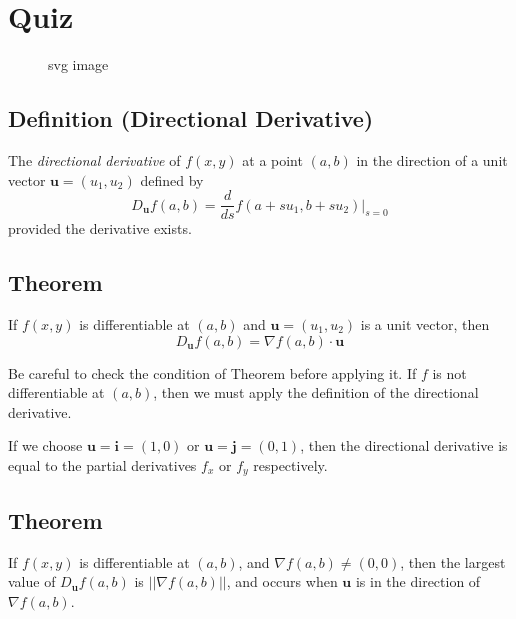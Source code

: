 \section{Quiz}
\begin{figure}[ht]
    \centering
    
    \caption{svg image}
  \end{figure}
\begin{defbox}
\subsection{Definition (Directional Derivative)}
The \emph{directional derivative} of $ f(x,y) $ at a point $ (a,b) $ 
in the direction of a unit vector $ \mathbf{u}=(u_1,u_2) $ 
defined by
\[ D_{\mathbf{u}}f(a,b)=
\frac{d}{ds} f(a+su_1,b+su_2)\Bigr\rvert_{s=0} \]
provided the derivative exists.
\end{defbox}

\begin{thmbox}
\subsection{Theorem}
If $ f(x,y) $ is differentiable at $ (a,b) $ and 
$ \mathbf{u}=(u_1,u_2) $ is a unit vector, then
\[ D_{\mathbf{u}}f(a,b)=\nabla f(a,b) \cdot \mathbf{u} \]
\end{thmbox}

\begin{remark}
    Be careful to check the condition of Theorem before
    applying it. If $ f $ is not differentiable at
    $ (a,b) $, then we must apply the definition of the
    directional derivative.
\end{remark}
\begin{remark}
    If we choose $ \mathbf{u}=\mathbf{i}=(1,0) $ or
    $ \mathbf{u}=\mathbf{j}=(0,1) $, then the directional
    derivative is equal to the partial derivatives $ f_x $ or $ f_y $
    respectively.
\end{remark}

\begin{thmbox}
\subsection{Theorem}
If $ f(x,y) $ is differentiable at $ (a,b) $, and
$ \nabla f(a,b)\neq (0,0) $, then the largest value of
$ D_{\mathbf{u}}f(a,b) $ is $ ||\nabla f(a,b)|| $, and
occurs when $ \mathbf{u} $ is in the direction of
$ \nabla f(a,b) $.
\end{thmbox}

